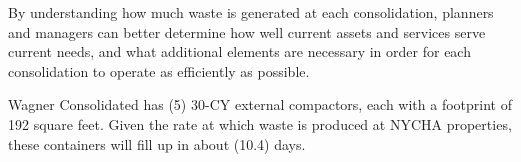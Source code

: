 
    By understanding how much waste is generated at each consolidation, planners and managers
    can better determine how well current assets and services serve current needs, and what additional 
    elements are necessary in order for each consolidation to operate as efficiently as possible. 

    Wagner Consolidated has (5) 30-CY external compactors, each with a footprint of 192 square feet. Given the rate at which waste is produced at NYCHA properties, these containers will fill
    up in about (10.4) days.